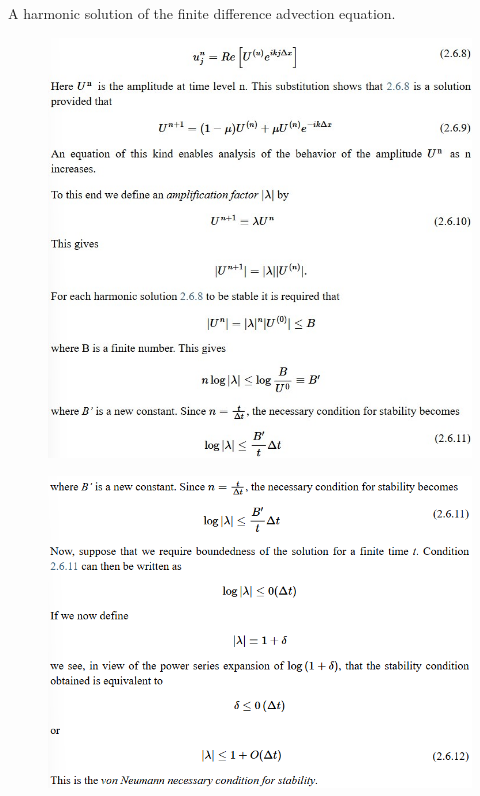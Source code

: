 A harmonic  solution of the finite difference advection equation. 
\begin{figure}[htp!]
    \centering
    \includegraphics[width=0.65\linewidth]{uploads/Immagine 2024-12-07 103148.jpg}
\end{figure}
\begin{figure}[htp!]
    \centering
    \includegraphics[width=0.65\linewidth]{uploads/hhhhh.png}
\end{figure}

